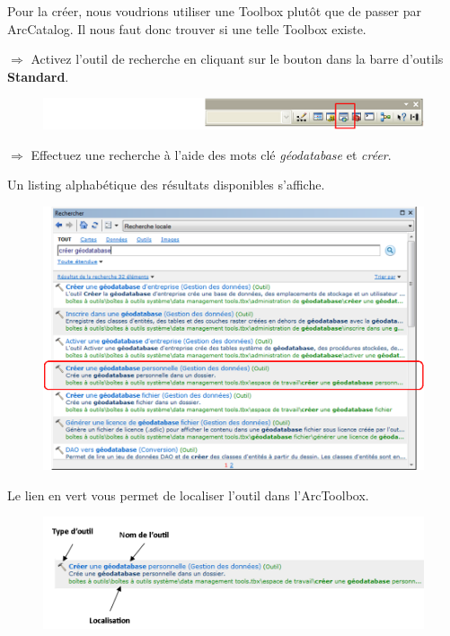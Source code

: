 \documentclass[11pt]{article}
\newcommand{\action}{$\Rightarrow$ }
\begin{document}
Pour la créer, nous voudrions utiliser une Toolbox plutôt que de passer par ArcCatalog.
Il nous faut donc trouver si une telle Toolbox existe.

\action Activez l'outil de recherche en cliquant sur le bouton dans la barre d'outils \textbf{Standard}.
\begin{figure}[H]
	\center \includegraphics{img/td3/arctoolbox_bouton_recherche.png}\\
\end{figure}

\action Effectuez une recherche à l'aide des mots clé \textit{géodatabase} et \textit{créer}.

Un listing alphabétique des résultats disponibles s'affiche.

\begin{figure}[H]
	\center \includegraphics{img/td3/arctoolbox_recherche.png}\\
\end{figure}

Le lien en vert vous permet de localiser l'outil dans l'ArcToolbox.

\begin{figure}[H]
	\center \includegraphics{img/td3/arctoolbox_recherche-2.png}\\
\end{figure}
\end{document}
